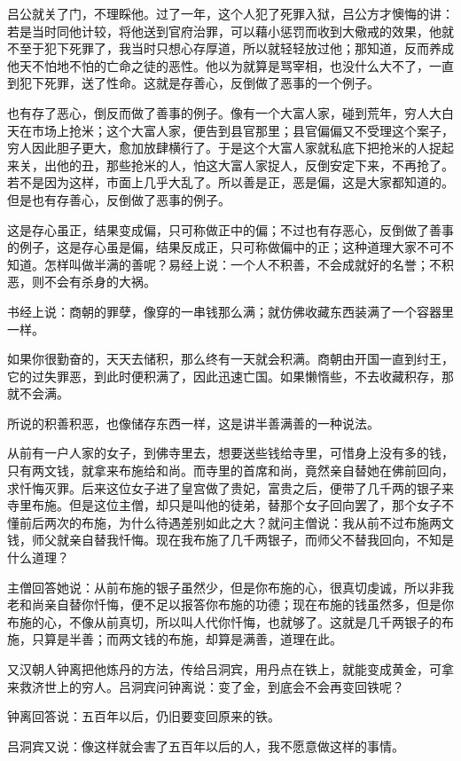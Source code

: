 \documentclass[12pt,twoside,openany]{book}
\begin{document}
吕公就关了门，不理睬他。过了一年，这个人犯了死罪入狱，吕公方才懊悔的讲：若是当时同他计较，将他送到官府治罪，可以藉小惩罚而收到大儆戒的效果，他就不至于犯下死罪了，我当时只想心存厚道，所以就轻轻放过他；那知道，反而养成他天不怕地不怕的亡命之徒的恶性。他以为就算是骂宰相，也没什么大不了，一直到犯下死罪，送了性命。这就是存善心，反倒做了恶事的一个例子。

也有存了恶心，倒反而做了善事的例子。像有一个大富人家，碰到荒年，穷人大白天在市场上抢米；这个大富人家，便告到县官那里；县官偏偏又不受理这个案子，穷人因此胆子更大，愈加放肆横行了。于是这个大富人家就私底下把抢米的人捉起来关，出他的丑，那些抢米的人，怕这大富人家捉人，反倒安定下来，不再抢了。若不是因为这样，市面上几乎大乱了。所以善是正，恶是偏，这是大家都知道的。但是也有存善心，反倒做了恶事的例子。

这是存心虽正，结果变成偏，只可称做正中的偏；不过也有存恶心，反倒做了善事的例子，这是存心虽是偏，结果反成正，只可称做偏中的正；这种道理大家不可不知道。怎样叫做半满的善呢？易经上说：一个人不积善，不会成就好的名誉；不积恶，则不会有杀身的大祸。

书经上说：商朝的罪孽，像穿的一串钱那么满；就仿佛收藏东西装满了一个容器里一样。

如果你很勤奋的，天天去储积，那么终有一天就会积满。商朝由开国一直到纣王，它的过失罪恶，到此时便积满了，因此迅速亡国。如果懒惰些，不去收藏积存，那就不会满。

所说的积善积恶，也像储存东西一样，这是讲半善满善的一种说法。

从前有一户人家的女子，到佛寺里去，想要送些钱给寺里，可惜身上没有多的钱，只有两文钱，就拿来布施给和尚。而寺里的首席和尚，竟然亲自替她在佛前回向，求忏悔灭罪。后来这位女子进了皇宫做了贵妃，富贵之后，便带了几千两的银子来寺里布施。但是这位主僧，却只是叫他的徒弟，替那个女子回向罢了，那个女子不懂前后两次的布施，为什么待遇差别如此之大？就问主僧说：我从前不过布施两文钱，师父就亲自替我忏悔。现在我布施了几千两银子，而师父不替我回向，不知是什么道理？

主僧回答她说：从前布施的银子虽然少，但是你布施的心，很真切虔诚，所以非我老和尚亲自替你忏悔，便不足以报答你布施的功德；现在布施的钱虽然多，但是你布施的心，不像从前真切，所以叫人代你忏悔，也就够了。这就是几千两银子的布施，只算是半善；而两文钱的布施，却算是满善，道理在此。

又汉朝人钟离把他炼丹的方法，传给吕洞宾，用丹点在铁上，就能变成黄金，可拿来救济世上的穷人。吕洞宾问钟离说：变了金，到底会不会再变回铁呢？

钟离回答说：五百年以后，仍旧要变回原来的铁。

吕洞宾又说：像这样就会害了五百年以后的人，我不愿意做这样的事情。
\end{document}
